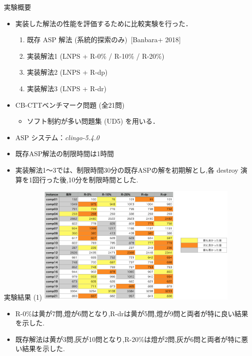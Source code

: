 \documentclass[11pt,dvipdfmx]{beamer}
\begin{document}
\begin{frame}{実験概要}
  \begin{itemize}
    \item 実装した解法の性能を評価するために比較実験を行った．
    \begin{enumerate}
      \item 既存 ASP 解法 (系統的探索のみ)~[Banbara+ 2018]
      \item 実装解法1 (LNPS + R-0\% / R-10\% / R-20\%)
      \item 実装解法2 (LNPS + R-dp)
      \item 実装解法3 (LNPS + R-dr)
    \end{enumerate}
    \item CB-CTTベンチマーク問題 (全21問)
    \begin{itemize}
      \item ソフト制約が多い問題集 (UD5) を用いる．
    \end{itemize}
    \item ASP システム：\textit{clingo-5.4.0}
    \item 既存ASP解法の制限時間は1時間
   \item 実装解法1〜3では、制限時間30分の既存ASPの解を初期解とし,各 destroy 演算を1回行った後,10分を制限時間とした.
  \end{itemize}
\end{frame}
\begin{frame}{実験結果 (1)}
 \centering
 \includegraphics[width=10cm]{pic/opt.png}
 \begin{itemize}
 \item \small R-0\%は黄が7問,燈が6問となり,R-drは黄が5問,燈が9問と両者が特に良い結果を示した.
 \item \small 既存解法は黄が3問,灰が10問となり,R-20\%は燈が2問,灰が6問と両者が特に悪い結果を示した.
 \end{itemize}
\end{frame}
\end{document}
